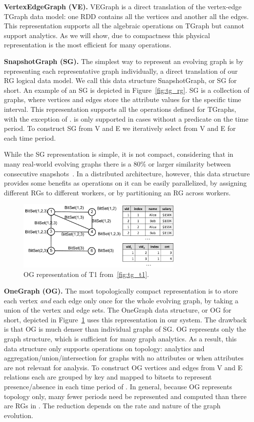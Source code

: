 {\bf VertexEdgeGraph (VE).} VEGraph is a direct translation of the
vertex-edge TGraph data model: one RDD contains all the vertices and
another all the edges.  This representation supports all the algebraic
operations on TGraph but cannot support analytics.  As we will show,
due to compactness this physical representation is the most efficient
for many operations.

{\bf SnapshotGraph (SG).} The simplest way to represent an evolving
graph is by representing each representative graph individually, a
direct translation of our RG logical data model.  We call this data
structure SnapshotGraph, or SG for short. An example of an SG is
depicted in Figure~\ref{fig:tg_rg}.  SG is a collection of graphs,
where vertices and edges store the attribute values for the specific
time interval.  This representation supports all the operations
defined for TGraphs, with the exception of
.  is only supported in cases without a
predicate on the time period.  To construct SG from V and E we
iteratively select from V and E for each time period.

While the SG representation is simple, it is not compact, considering
that in many real-world evolving graphs there is a 80\% or larger
similarity between consecutive
snapshots~\cite{DBLP:journals/tos/MiaoHLWYZPCC15}.  In a distributed
architecture, however, this data structure provides some benefits as
operations on it can be easily parallelized, by assigning different
RGs to different workers, or by partitioning an RG across workers.

\begin{figure}[t!]
\includegraphics[width=3.2in]{figs/ogc.pdf}
\caption{OG representation of T1 from~\ref{fig:tg_t1}.}
\label{fig:ogc}
\end{figure}

{\bf OneGraph (OG).}  The most topologically compact representation is
to store each vertex {\em and} each edge only once for the whole
evolving graph, by taking a union of the vertex and edge sets.  The
OneGraph data structure, or OG for short, depicted in
Figure~\ref{fig:ogc} uses this representation in our system.  The
drawback is that OG is much denser than individual graphs of SG.  OG
represents only the graph structure, which is sufficient for many
graph analytics.  As a result, this data structure only supports
operations on topology: analytics and aggregation/union/intersection
for graphs with no attributes or when attributes are not relevant for
analysis.  To construct OG vertices and edges from V and E relations
each are grouped by key and mapped to bitsets to represent
presence/absence in each time period of \tg.  In general, because OG
represents topology only, many fewer periods need be represented and
computed than there are RGs in \tg.  The reduction depends on the rate
and nature of the graph evolution.

